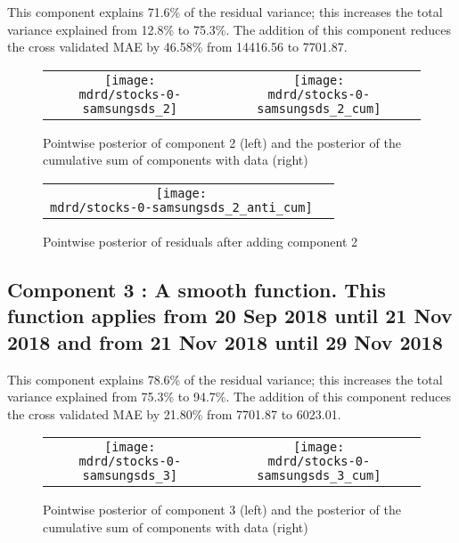\documentclass{article} %
\begin{document}
This component explains 71.6\% of the residual variance; this increases the total variance explained from 12.8\% to 75.3\%.
The addition of this component reduces the cross validated MAE by 46.58\% from 14416.56 to 7701.87.


\begin{figure}[H]
\newcommand{\wmgd}{0.5\columnwidth}
\newcommand{\hmgd}{3.0cm}
\newcommand{\mdrd}{stocks-0-samsungsds}
\newcommand{\mbm}{\hspace{-0.3cm}}
\begin{tabular}{cc}
\mbm \texttt{[image: \\mdrd/stocks-0-samsungsds\_2]} & \texttt{[image: \\mdrd/stocks-0-samsungsds\_2\_cum]}
\end{tabular}
\caption{Pointwise posterior of component 2 (left) and the posterior of the cumulative sum of components with data (right)}
\label{fig:comp2}
\end{figure}

\begin{figure}[H]
\newcommand{\wmgd}{0.5\columnwidth}
\newcommand{\hmgd}{3.0cm}
\newcommand{\mdrd}{stocks-0-samsungsds}
\newcommand{\mbm}{\hspace{-0.3cm}}
\begin{tabular}{cc}
\mbm \texttt{[image: \\mdrd/stocks-0-samsungsds\_2\_anti\_cum]}
\end{tabular}
\caption{Pointwise posterior of residuals after adding component 2}
\label{fig:comp2}
\end{figure}

\subsection{Component 3 : A smooth function. This function applies from 20 Sep 2018 until 21 Nov 2018 and from 21 Nov 2018 until 29 Nov 2018}



This component explains 78.6\% of the residual variance; this increases the total variance explained from 75.3\% to 94.7\%.
The addition of this component reduces the cross validated MAE by 21.80\% from 7701.87 to 6023.01.


\begin{figure}[H]
\newcommand{\wmgd}{0.5\columnwidth}
\newcommand{\hmgd}{3.0cm}
\newcommand{\mdrd}{stocks-0-samsungsds}
\newcommand{\mbm}{\hspace{-0.3cm}}
\begin{tabular}{cc}
\mbm \texttt{[image: \\mdrd/stocks-0-samsungsds\_3]} & \texttt{[image: \\mdrd/stocks-0-samsungsds\_3\_cum]}
\end{tabular}
\caption{Pointwise posterior of component 3 (left) and the posterior of the cumulative sum of components with data (right)}
\label{fig:comp3}
\end{figure}
\end{document}
